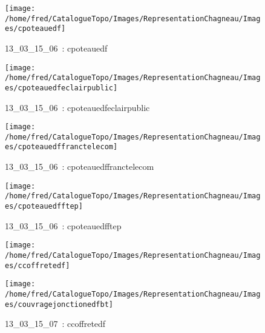 \documentclass[12pt,titlepage]{book}
\begin{document}
\begin{figure}[h!]
\begin{minipage}[t]{3cm}
    \begin{center}
      \texttt{[image: /home/fred/CatalogueTopo/Images/RepresentationChagneau/Images/cpoteauedf]}
      \caption[~13\_03\_15\_06]{\small{13\_03\_15\_06~:} \tiny{cpoteauedf}}\label{cpoteauedf}
    \end{center}
  \end{minipage}
  \begin{minipage}[t]{3cm}
    \begin{center}
      \texttt{[image: /home/fred/CatalogueTopo/Images/RepresentationChagneau/Images/cpoteauedfeclairpublic]}
      \caption[~13\_03\_15\_06]{\small{13\_03\_15\_06~:} \tiny{cpoteauedfeclairpublic}}\label{cpoteauedfeclairpublic}
    \end{center}
  \end{minipage}
  \begin{minipage}[t]{3cm}
    \begin{center}
      \texttt{[image: /home/fred/CatalogueTopo/Images/RepresentationChagneau/Images/cpoteauedffranctelecom]}
      \caption[~13\_03\_15\_06]{\small{13\_03\_15\_06~:} \tiny{cpoteauedffranctelecom}}\label{cpoteauedffranctelecom}
    \end{center}
  \end{minipage}
  \begin{minipage}[t]{3cm}
    \begin{center}
      \texttt{[image: /home/fred/CatalogueTopo/Images/RepresentationChagneau/Images/cpoteauedfftep]}
      \caption[~13\_03\_15\_06]{\small{13\_03\_15\_06~:} \tiny{cpoteauedfftep}}\label{cpoteauedfftep}
    \end{center}
  \end{minipage}
  \begin{minipage}[t]{3cm}
    \begin{center}
      \texttt{[image: /home/fred/CatalogueTopo/Images/RepresentationChagneau/Images/ccoffretedf]}
      \caption[~13\_03\_15\_07]{\small{13\_03\_15\_07~:} \tiny{ccoffretedf}}\label{ccoffretedf}
    \end{center}
  \end{minipage}
  \begin{minipage}[t]{3cm}
    \begin{center}
      \texttt{[image: /home/fred/CatalogueTopo/Images/RepresentationChagneau/Images/couvragejonctionedfbt]}

\end{center}
\end{minipage}
\end{figure}
\end{document}
